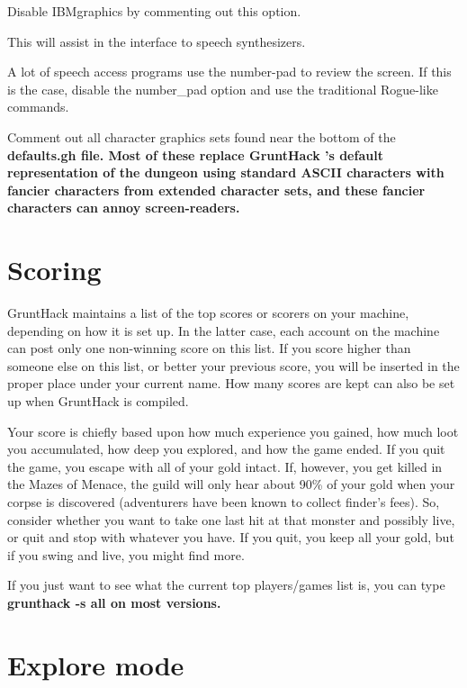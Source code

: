 \blist{}
\item[\tb {IBMgraphics}]
Disable IBMgraphics by commenting out this option.
\item[\tb {menustyle:traditional}]
This will assist in the interface to speech synthesizers.
\item[\tb {number\_pad}]
A lot of speech access programs use the number-pad to review the screen.
If this is the case, disable the number\_pad option and use the traditional
Rogue-like commands.
\item[\tb {"Character graphics"}]
Comment out all character graphics sets found near the bottom of the
%
\bf defaults.gh \rm%
file.  Most of these replace %
\bf GruntHack\rm%
's
default representation of the dungeon using standard ASCII characters
with fancier characters from extended character sets, and these fancier
characters can annoy screen-readers.
\elist
\section{Scoring}

GruntHack maintains a list of the top scores or scorers on your machine,
depending on how it is set up.  In the latter case, each account on
the machine can post only one non-winning score on this list.  If
you score higher than someone else on this list, or better your
previous score, you will be inserted in the proper place under your
current name.  How many scores are kept can also be set up when
GruntHack is compiled.

Your score is chiefly based upon how much experience you gained, how
much loot you accumulated, how deep you explored, and how the game
ended.  If you quit the game, you escape with all of your gold intact.
If, however, you get killed in the Mazes of Menace, the guild will
only hear about 90\% of your gold when your corpse is discovered
(adventurers have been known to collect finder's fees).  So, consider
whether you want to take one last hit at that monster and possibly
live, or quit and stop with whatever you have.  If you quit, you keep
all your gold, but if you swing and live, you might find more.

If you just want to see what the current top players/games list is, you
can type %
\bf grunthack -s all \rm%
on most versions.

\section{Explore mode}

